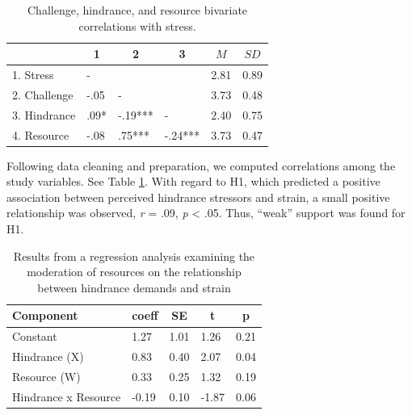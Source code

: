\documentclass[
  english,
  man]{apa6}
\begin{document}
\begin{table}[tbp]

\begin{center}
\begin{threeparttable}

\caption{\label{tab:cortab}Challenge, hindrance, and resource bivariate correlations with stress.}

\begin{tabular}{llllll}
\toprule
 & \multicolumn{1}{c}{1} & \multicolumn{1}{c}{2} & \multicolumn{1}{c}{3} & \multicolumn{1}{c}{$M$} & \multicolumn{1}{c}{$SD$}\\
\midrule
1. Stress & - &  &  & 2.81 & 0.89\\
2. Challenge & -.05 & - &  & 3.73 & 0.48\\
3. Hindrance & .09* & -.19*** & - & 2.40 & 0.75\\
4. Resource & -.08 & .75*** & -.24*** & 3.73 & 0.47\\
\bottomrule
\end{tabular}

\end{threeparttable}
\end{center}

\end{table}

Following data cleaning and preparation, we computed correlations among the study variables. See Table \ref{tab:cortab}. With regard to H1, which predicted a positive association between perceived hindrance stressors and strain, a small positive relationship was observed, \emph{r} = .09, \emph{p} \textless{} .05. Thus, ``weak'' support was found for H1.

\begin{table}[tbp]

\begin{center}
\begin{threeparttable}

\caption{\label{tab:table}Results from a regression analysis examining the moderation of resources on the relationship between hindrance demands and strain}

\begin{tabular}{lllll}
\toprule
Component & \multicolumn{1}{c}{coeff} & \multicolumn{1}{c}{SE} & \multicolumn{1}{c}{t} & \multicolumn{1}{c}{p}\\
\midrule
Constant & 1.27 & 1.01 & 1.26 & 0.21\\
Hindrance (X) & 0.83 & 0.40 & 2.07 & 0.04\\
Resource (W) & 0.33 & 0.25 & 1.32 & 0.19\\
Hindrance x Resource & -0.19 & 0.10 & -1.87 & 0.06\\
\bottomrule
\end{tabular}

\end{threeparttable}
\end{center}

\end{table}
\end{document}
